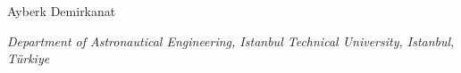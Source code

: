 



\thispagestyle{plain}

\begin{center}
  {\LARGE\bfseries \papertitle\par}
  \vspace{14pt}
  {\large Ayberk Demirkanat\par}
  \vspace{4pt}
  {\small\itshape Department of Astronautical Engineering, Istanbul
  Technical University, Istanbul, T\"urkiye\par}
  \vspace{2pt}
  {\small {}\par}
\end{center}


